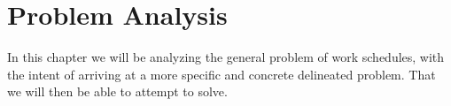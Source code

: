 \chapter{Problem Analysis}
In this chapter we will be analyzing the general problem of work schedules, with the intent of arriving at a more specific and concrete delineated problem. That we will then be able to attempt to solve.